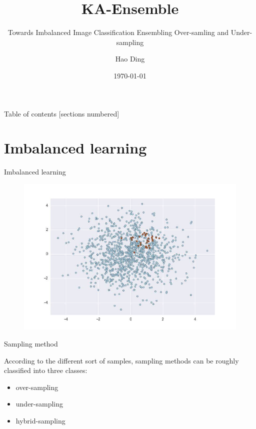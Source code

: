 \documentclass[10pt]{beamer}
\title{KA-Ensemble }
\subtitle{Towards Imbalanced Image Classification Ensembling Over-samling and Under-sampling}
\date{\today}
\author{Hao Ding}
\institute{Ocean Univercity of China}
\begin{document}
\maketitle

\begin{frame}{Table of contents}
  [sections numbered]
  \tableofcontents[hideallsubsections]
\end{frame}

\section{Imbalanced learning}

\begin{frame}[fragile]{Imbalanced learning}

\begin{figure}[!ht]
\centering
  \includegraphics[width=\linewidth]{0}
  \label{fig:a}
\end{figure}
\end{frame}

\begin{frame}[fragile]{Sampling method}

According to the different sort of samples, sampling methods can be roughly classified into three classes: 
\begin{itemize}
\item over-sampling
\item under-sampling
\item hybrid-sampling
\end{itemize}
  
\end{frame}
\end{document}
